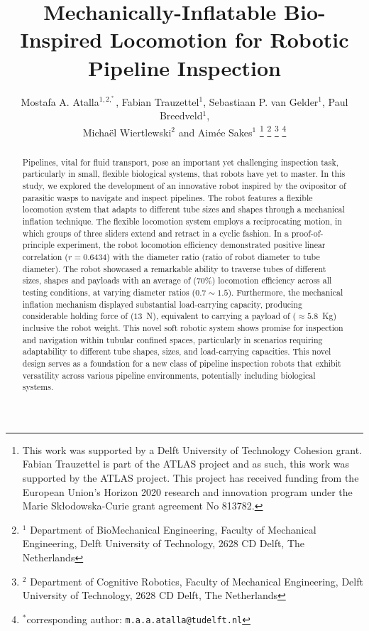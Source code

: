 \documentclass[letterpaper, 10 pt, conference]{ieeeconf}  %
\title{\LARGE \bf
Mechanically-Inflatable Bio-Inspired Locomotion for Robotic Pipeline Inspection
}
\author{Mostafa A. Atalla$^{1,2,^{*}}$, Fabian Trauzettel$^{1}$, Sebastiaan P. van Gelder$^{1}$, Paul Breedveld$^{1}$,\\ Michaël Wiertlewski$^{2}$ and Aimée Sakes$^{1}$%
\thanks{This work was supported by a Delft University of Technology Cohesion grant. Fabian Trauzettel is part of the ATLAS project and as such, this work was supported by the ATLAS project. This project has received funding from the European Union’s Horizon 2020 research and innovation program under the  Marie Skłodowska-Curie grant agreement No 813782.}
\thanks{$^{1}$ Department of BioMechanical Engineering, Faculty of Mechanical Engineering, Delft University of Technology, 2628 CD Delft, The Netherlands}
\thanks{$^{2}$ Department of Cognitive Robotics, Faculty of Mechanical Engineering, Delft University of Technology, 2628 CD Delft, The Netherlands}
\thanks{$^{*}$corresponding author: {\tt\small m.a.a.atalla@tudelft.nl}}}
\begin{document}
\maketitle
\thispagestyle{empty}
\pagestyle{empty}




\begin{abstract}
Pipelines, vital for fluid transport, pose an important yet challenging inspection task, particularly in small, flexible biological systems, that robots have yet to master. In this study, we explored the development of an innovative robot inspired by the ovipositor of parasitic wasps to navigate and inspect pipelines. The robot features a flexible locomotion system that adapts to different tube sizes and shapes through a mechanical inflation technique. The flexible locomotion system employs a reciprocating motion, in which groups of three sliders extend and retract in a cyclic fashion. In a proof-of-principle experiment, the robot locomotion efficiency demonstrated positive linear correlation ($r=0.6434$) with the diameter ratio (ratio of robot diameter to tube diameter). The robot showcased a remarkable ability to traverse tubes of different sizes, shapes and payloads with an average of ($70\%$) locomotion efficiency across all testing conditions, at varying diameter ratios ($0.7\sim1.5$). Furthermore, the mechanical inflation mechanism displayed substantial load-carrying capacity, producing considerable holding force of ($13$~N), equivalent to carrying a payload of ($\approx 5.8$~Kg) inclusive the robot weight. This novel soft robotic system shows promise for inspection and navigation within tubular confined spaces, particularly in scenarios requiring adaptability to different tube shapes, sizes, and load-carrying capacities. This novel design serves as a foundation for a new class of pipeline inspection robots that exhibit versatility across various pipeline environments, potentially including biological systems. 
\end{abstract}
 

\end{document}
